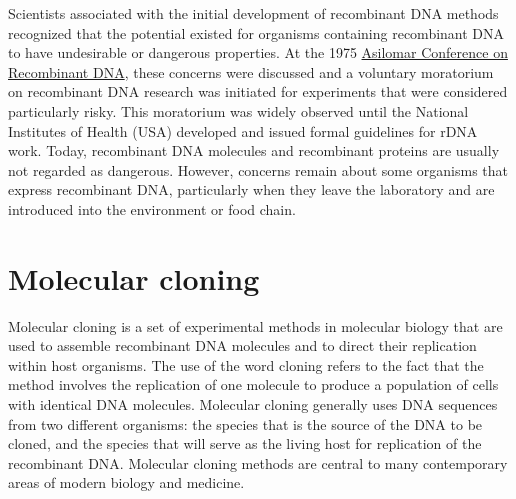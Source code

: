 Scientists associated with the initial development of recombinant DNA methods recognized that the potential existed for organisms containing recombinant DNA to have undesirable or dangerous properties. At the 1975 \href{https://en.wikipedia.org/wiki/Asilomar_Conference_on_Recombinant_DNA}{Asilomar Conference on Recombinant DNA}, these concerns were discussed and a voluntary moratorium on recombinant DNA research was initiated for experiments that were considered particularly risky. This moratorium was widely observed until the National Institutes of Health (USA) developed and issued formal guidelines for rDNA work. Today, recombinant DNA molecules and recombinant proteins are usually not regarded as dangerous. However, concerns remain about some organisms that express recombinant DNA, particularly when they leave the laboratory and are introduced into the environment or food chain.

\hypertarget{molecular-cloning}{%
\section{Molecular cloning}\label{molecular-cloning}}

Molecular cloning is a set of experimental methods in molecular biology that are used to assemble recombinant DNA molecules and to direct their replication within host organisms. The use of the word cloning refers to the fact that the method involves the replication of one molecule to produce a population of cells with identical DNA molecules. Molecular cloning generally uses DNA sequences from two different organisms: the species that is the source of the DNA to be cloned, and the species that will serve as the living host for replication of the recombinant DNA. Molecular cloning methods are central to many contemporary areas of modern biology and medicine.




